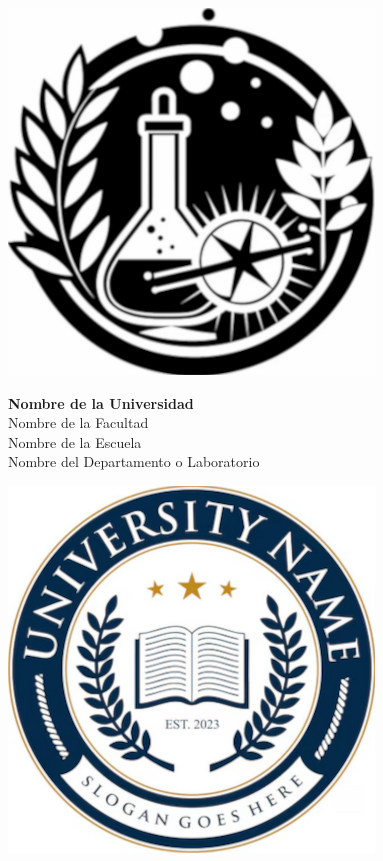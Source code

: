 
   \begin{minipage}{0.15\textwidth} \begin{flushleft}
   \includegraphics[scale = 0.85]{img/portada/logo-ciencias.png}
   \end{flushleft}\end{minipage}
   \begin{minipage}{0.70\linewidth}
   \begin{center}
   \vspace*{0.5em}
   \Large\textbf{Nombre de la Universidad}\\
   \vspace*{0.25em}
   \normalsize{Nombre de la Facultad}\\
   \vspace*{0.25em}
   \normalsize{Nombre de la Escuela}\\
   \vspace*{0.25em}
   \normalsize{Nombre del Departamento o Laboratorio}\\
   \end{center}
   \end{minipage}
   \begin{minipage}{0.15\textwidth} \begin{flushright}
   \includegraphics[scale = 0.85]{img/portada/university-logo.png}
   \end{flushright}\end{minipage}

